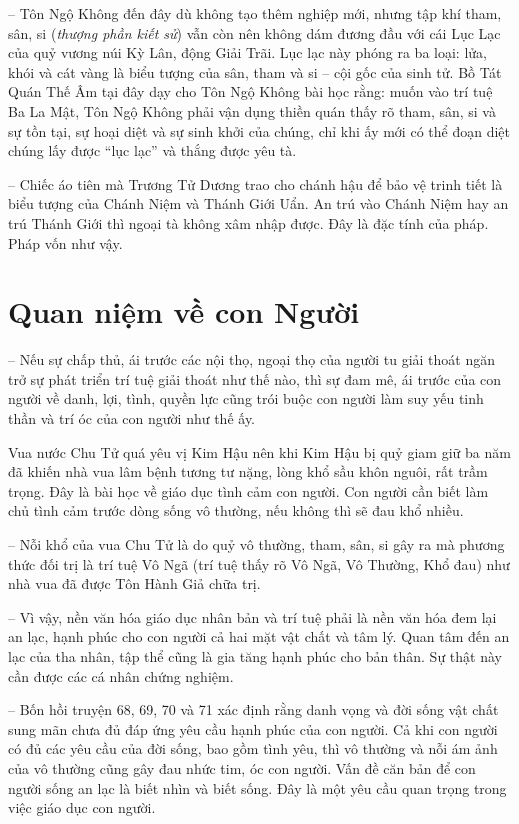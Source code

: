 -- Tôn Ngộ Không đến đây dù không tạo thêm nghiệp mới, nhưng tập khí tham, sân, si (\emph{thượng phần kiết sử}) vẫn còn nên không dám đương đầu với cái Lục Lạc của quỷ vương núi Kỳ Lân, động Giải Trãi. Lục lạc này phóng ra ba loại: lửa, khói và cát vàng là biểu tượng của sân, tham và si -- cội gốc của sinh tử. Bồ Tát Quán Thế Âm tại đây dạy cho Tôn Ngộ Không bài học rằng: muốn vào trí tuệ Ba La Mật, Tôn Ngộ Không phải vận dụng thiền quán thấy rõ tham, sân, si và sự tồn tại, sự hoại diệt và sự sinh khởi của chúng, chỉ khi ấy mới có thể đoạn diệt chúng lấy được ``lục lạc'' và thắng được yêu tà.

-- Chiếc áo tiên mà Trương Tử Dương trao cho chánh hậu để bảo vệ trinh tiết là biểu tượng của Chánh Niệm và Thánh Giới Uẩn. An trú vào Chánh Niệm hay an trú Thánh Giới thì ngoại tà không xâm nhập được. Đây là đặc tính của pháp. Pháp vốn như vậy.

\section{Quan niệm về con Người} %
\label{sec:68_69_con_nguoi}

-- Nếu sự chấp thủ, ái trước các nội thọ, ngoại thọ của người tu giải thoát ngăn trở sự phát triển trí tuệ giải thoát như thế nào, thì sự đam mê, ái trước của con người về danh, lợi, tình, quyền lực cũng trói buộc con người làm suy yếu tinh thần và trí óc của con người như thế ấy.

Vua nước Chu Tử quá yêu vị Kim Hậu nên khi Kim Hậu bị quỷ giam giữ ba năm đã khiến nhà vua lâm bệnh tương tư nặng, lòng khổ sầu khôn nguôi, rất trầm trọng. Đây là bài học về giáo dục tình cảm con người. Con người cần biết làm chủ tình cảm trước dòng sống vô thường, nếu không thì sẽ đau khổ nhiều.

-- Nỗi khổ của vua Chu Tử là do quỷ vô thường, tham, sân, si gây ra mà phương thức đối trị là trí tuệ Vô Ngã (trí tuệ thấy rõ Vô Ngã, Vô Thường, Khổ đau) như nhà vua đã được Tôn Hành Giả chữa trị.

-- Vì vậy, nền văn hóa giáo dục nhân bản và trí tuệ phải là nền văn hóa đem lại an lạc, hạnh phúc cho con người cả hai mặt vật chất và tâm lý. Quan tâm đến an lạc của tha nhân, tập thể cũng là gia tăng hạnh phúc cho bản thân. Sự thật này cần được các cá nhân chứng nghiệm.

-- Bốn hồi truyện 68, 69, 70 và 71 xác định rằng danh vọng và đời sống vật chất sung mãn chưa đủ đáp ứng yêu cầu hạnh phúc của con người. Cả khi con người có đủ các yêu cầu của đời sống, bao gồm tình yêu, thì vô thường và nỗi ám ảnh của vô thường cũng gây đau nhức tim, óc con người. Vấn đề căn bản để con người sống an lạc là biết nhìn và biết sống. Đây là một yêu cầu quan trọng trong việc giáo dục con người.

